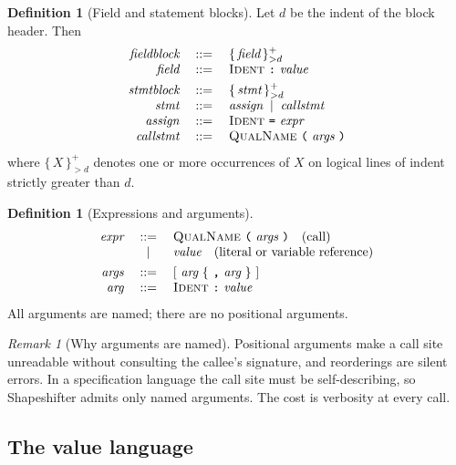 \documentclass[11pt,twocolumn,a4paper]{article}
\theoremstyle{ssthm}
\theoremstyle{definition}
\newtheorem{definition}[theorem]{Definition}
\theoremstyle{remark}
\newtheorem{remark}[theorem]{Remark}
\newcommand{\bnf}{\;::=\;}
\newcommand{\alt}{\;\mid\;}
\newcommand{\shk}[1]{\texttt{#1}}
\begin{document}
\begin{definition}[Field and statement blocks]
\label{def:bodies}
Let $d$ be the indent of the block header. Then
\[
\begin{array}{rcl}
\textit{fieldblock} &\bnf& \{\,\textit{field}\,\}^{+}_{>d}\\
\textit{field}      &\bnf& \textsc{Ident}\ \shk{:}\ \textit{value}\\[4pt]
\textit{stmtblock}  &\bnf& \{\,\textit{stmt}\,\}^{+}_{>d}\\
\textit{stmt}       &\bnf& \textit{assign} \alt \textit{callstmt}\\
\textit{assign}     &\bnf& \textsc{Ident}\ \shk{=}\ \textit{expr}\\
\textit{callstmt}   &\bnf& \textsc{QualName}\ \shk{(}\ \textit{args}\ \shk{)}
\end{array}
\]
where $\{\,X\,\}^{+}_{>d}$ denotes one or more occurrences of $X$ on
logical lines of indent strictly greater than $d$.
\end{definition}

\begin{definition}[Expressions and arguments]
\label{def:expr}
\[
\begin{array}{rcl}
\textit{expr} &\bnf& \textsc{QualName}\ \shk{(}\ \textit{args}\ \shk{)}
                     \quad\text{(call)}\\
              &\alt& \textit{value} \quad\text{(literal or variable reference)}\\[4pt]
\textit{args} &\bnf& [\ \textit{arg}\ \{\ \shk{,}\ \textit{arg}\ \}\ ]\\
\textit{arg}  &\bnf& \textsc{Ident}\ \shk{:}\ \textit{value}
\end{array}
\]
All arguments are named; there are no positional arguments.
\end{definition}

\begin{remark}[Why arguments are named]
\label{rem:named-args}
Positional arguments make a call site unreadable without consulting the
callee's signature, and reorderings are silent errors. In a
specification language the call site must be self-describing, so
Shapeshifter admits only named arguments. The cost is verbosity at every
call.
\end{remark}

\subsection{The value language}
\end{document}
